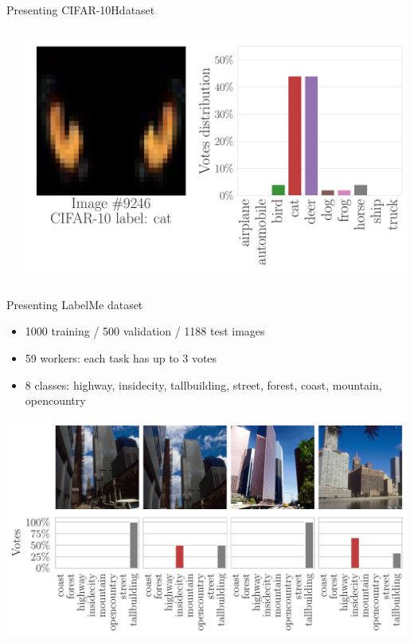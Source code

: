 \begin{frame}{Presenting CIFAR-10Hdataset}{}
\begin{columns}
\begin{column}{.3\textwidth}
        \end{column}
        \begin{column}{.3\textwidth}

            \includegraphics[width=\textwidth]{../chapters/images/image_n_hist9246_paper.pdf}

        \end{column}


    \end{columns}
\end{frame}
\begin{frame}{Presenting LabelMe dataset}{}
\begin{itemize}
    \item 1000 training / 500 validation / 1188 test images
    \item 59 workers: each task has up to 3 votes
    \item 8 classes: highway, insidecity, tallbuilding, street, forest, coast, mountain, opencountry
\end{itemize}

\pause

\centering
\includegraphics[width=.85\textwidth]{../chapters/images/tallbuilding_and_distrib.pdf}

\end{frame}

